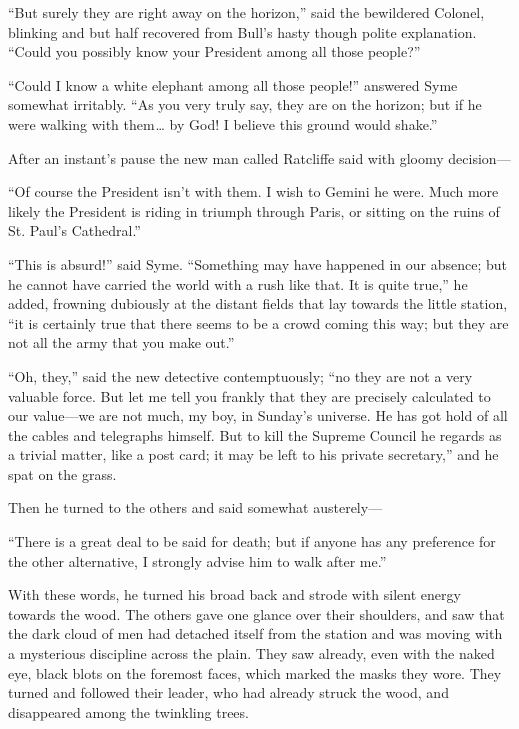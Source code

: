 “But surely they are right away on the horizon,” said the bewildered Colonel, blinking and but half recovered from Bull’s hasty though polite explanation. “Could you possibly know your President among all those people?”

“Could I know a white elephant among all those people!” answered Syme somewhat irritably. “As you very truly say, they are on the horizon; but if he were walking with them⁠ ⁠… by God! I believe this ground would shake.”

After an instant’s pause the new man called Ratcliffe said with gloomy decision⁠—

“Of course the President isn’t with them. I wish to Gemini he were. Much more likely the President is riding in triumph through Paris, or sitting on the ruins of St. Paul’s Cathedral.”

“This is absurd!” said Syme. “Something may have happened in our absence; but he cannot have carried the world with a rush like that. It is quite true,” he added, frowning dubiously at the distant fields that lay towards the little station, “it is certainly true that there seems to be a crowd coming this way; but they are not all the army that you make out.”

“Oh, they,” said the new detective contemptuously; “no they are not a very valuable force. But let me tell you frankly that they are precisely calculated to our value⁠—we are not much, my boy, in Sunday’s universe. He has got hold of all the cables and telegraphs himself. But to kill the Supreme Council he regards as a trivial matter, like a post card; it may be left to his private secretary,” and he spat on the grass.

Then he turned to the others and said somewhat austerely⁠—

“There is a great deal to be said for death; but if anyone has any preference for the other alternative, I strongly advise him to walk after me.”

With these words, he turned his broad back and strode with silent energy towards the wood. The others gave one glance over their shoulders, and saw that the dark cloud of men had detached itself from the station and was moving with a mysterious discipline across the plain. They saw already, even with the naked eye, black blots on the foremost faces, which marked the masks they wore. They turned and followed their leader, who had already struck the wood, and disappeared among the twinkling trees.

